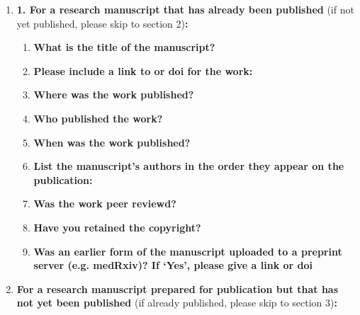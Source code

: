     \begin{enumerate}\itemsep0em
    
        \item \textbf{1.	For a research manuscript that has already been published} (if not yet published, please skip to section 2)\textbf{:}
        \begin{enumerate}\itemsep0em
            \item \textbf{What is the title of the manuscript?}
            \item \textbf{Please include a link to or doi for the work:}
            \item \textbf{Where was the work published?}
            \item \textbf{Who published the work?}
            \item \textbf{When was the work published?}
            \item \textbf{List the manuscript's authors in the order they appear on the publication:}
            \item \textbf{Was the work peer reviewd?}
            \item \textbf{Have you retained the copyright?}
            \item \textbf{Was an earlier form of the manuscript uploaded to a preprint server (e.g. medRxiv)? If ‘Yes’, please give a link or doi} 
        \end{enumerate}
        \item \textbf{For a research manuscript prepared for publication but that has not yet been published} (if already published, please skip to section 3)\textbf{:}

\end{enumerate}

